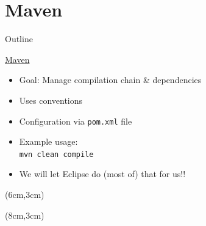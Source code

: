 \documentclass[English,c,%
hyperref={%
    pdftitle={FISA-DE2 OOP in Java},%
    pdfauthor={Muller, Gravier, Laforest, Subercaze},%
    pdfsubject={OOP in Java},%
    pdfkeywords={OOP, Java},%
    colorlinks=true,%
    urlcolor=blue,%
    linkcolor=%
    },%
xcolor={pdftex,svgnames} %
]{beamer}
\begin{document}
\section*{Maven}
   \begin{frame}{Outline}
       \tableofcontents[currentsubsection]
   \end{frame}
\begin{frame}[fragile]{\href{https://maven.apache.org/}{Maven}}
  \begin{itemize}
    \item<1-> Goal: Manage compilation chain \& dependencies
    \bigskip
    \item<2-> Uses conventions\\
    \bigskip
    \item<5-> Configuration via \texttt{pom.xml} file
    \bigskip
    \item<6-> Example usage:\\
    \texttt{mvn clean compile}
    \bigskip
    \item<7-> We will let Eclipse do (most of) that for us!!
  \end{itemize}

  \begin{textblock*}{0.4\linewidth}(6cm,3cm)%
  \end{textblock*}
  \begin{textblock*}{0.4\linewidth}(8cm,3cm)%
  \end{textblock*}

\end{frame}
\end{document}
